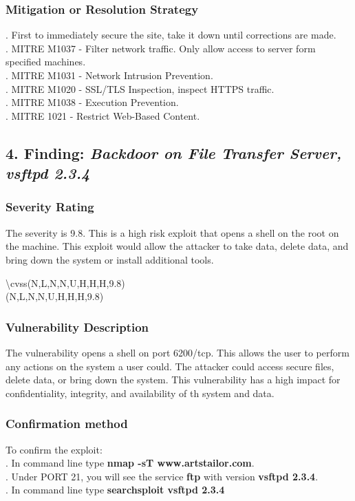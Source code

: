 \documentclass[notitlepage]{article}
\begin{document}
	\subsubsection{Mitigation or Resolution Strategy}
	. First to immediately secure the site, take it down until corrections are made. \\ 
	. MITRE M1037 - Filter network traffic. Only allow access to server form specified machines. \\
	. MITRE M1031 - Network Intrusion Prevention. \\
	. MITRE M1020 - SSL/TLS Inspection, inspect HTTPS traffic.\\
	. MITRE M1038 - Execution Prevention. \\
	. MITRE 1021 - Restrict Web-Based Content. \\
	
	
	\subsection{4. Finding: \emph{Backdoor on File Transfer Server, vsftpd 2.3.4}}
	
	\subsubsection{Severity Rating}
	The severity is 9.8. This is a high risk exploit that opens a shell on the root on the machine.  This exploit would allow the attacker to take data, delete data, and bring down the system or install additional tools.  
	
	\textbackslash cvss(N,L,N,N,U,H,H,H,9.8)\\
	\cvss(N,L,N,N,U,H,H,H,9.8) \\
	
	\subsubsection{Vulnerability Description}
	The vulnerability opens a shell on port 6200/tcp. This allows the user to perform any actions on the system a user could. The attacker could access secure files, delete data, or bring down the system. This vulnerability has a high impact for confidentiality, integrity, and availability of th system and data. 
	
	\subsubsection{Confirmation method}
	To confirm the exploit: \\
	. In command line type \textbf{nmap -sT www.artstailor.com}.\\
	. Under PORT 21, you will see the service \textbf{ftp} with version \textbf{vsftpd 2.3.4}. \\
	. In command line type \textbf{searchsploit vsftpd 2.3.4} \\
	
\end{document}
